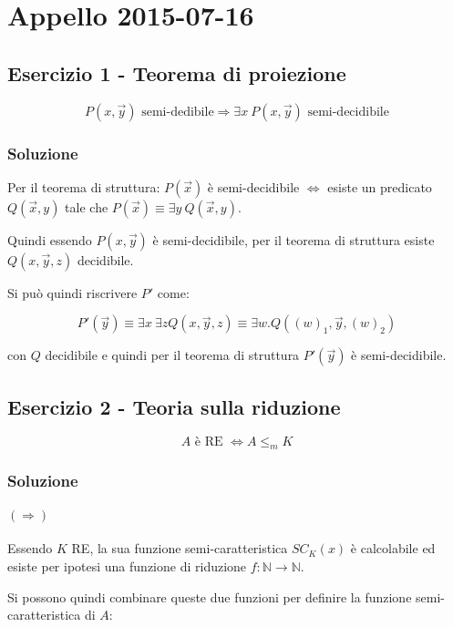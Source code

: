 
\section{Appello 2015-07-16}

\subsection{Esercizio 1 - Teorema di proiezione}

$$
P(x,\vec{y}) \text{ semi-dedibile} \Rightarrow \exists x \: P(x,\vec{y}) \text{ semi-decidibile}
$$

\subsubsection{Soluzione}

Per il teorema di struttura: $P(\vec{x})$ è semi-decidibile $\Leftrightarrow$ esiste un predicato $Q(\vec{x}, y)$ tale che $P(\vec{x}) \equiv \exists y \: Q(\vec{x}, y)$.

Quindi essendo $P(x,\vec{y})$ è semi-decidibile, per il teorema di struttura esiste $Q(x, \vec{y}, z)$ decidibile.

Si può quindi riscrivere $P'$ come:

$$
P'(\vec{y}) \equiv \exists x \: \exists z Q(x, \vec{y}, z) \equiv \exists w . Q( (w)_1, \vec{y}, (w)_2)
$$

con $Q$ decidibile e quindi per il teorema di struttura $P'(\vec{y})$ è semi-decidibile.

\subsection{Esercizio 2 - Teoria sulla riduzione}

$$
A \text{ è RE } \Leftrightarrow A \leq_m K
$$

\subsubsection{Soluzione}

\paragraph{$(\Rightarrow)$} 

Essendo $K$ RE, la sua funzione semi-caratteristica $SC_K(x)$ è calcolabile ed esiste per ipotesi una funzione di riduzione $f : \mathbb{N} \rightarrow \mathbb{N}$.

Si possono quindi combinare queste due funzioni per definire la funzione semi-caratteristica di $A$:

